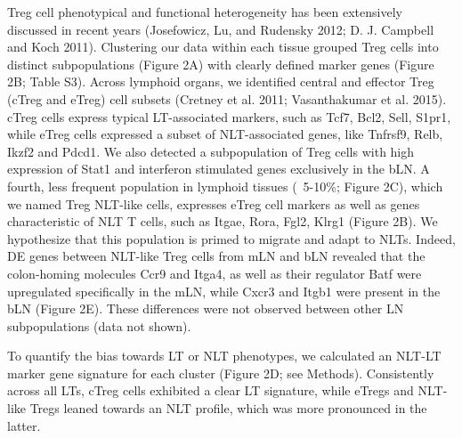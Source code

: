 Treg cell phenotypical and functional heterogeneity has been extensively discussed in recent years (Josefowicz, Lu, and Rudensky 2012; D. J. Campbell and Koch 2011). Clustering our data within each tissue grouped Treg cells into distinct subpopulations (Figure 2A) with clearly defined marker genes (Figure 2B; Table S3). Across lymphoid organs, we identified central and effector Treg (cTreg and eTreg) cell subsets (Cretney et al. 2011; Vasanthakumar et al. 2015). cTreg cells express typical LT-associated markers, such as Tcf7, Bcl2, Sell, S1pr1, while eTreg cells expressed a subset of NLT-associated genes, like Tnfrsf9, Relb, Ikzf2 and Pdcd1. We also detected a subpopulation of Treg cells with high expression of Stat1 and interferon stimulated genes exclusively in the bLN. A fourth, less frequent population in lymphoid tissues (~5-10\%; Figure 2C), which we named Treg NLT-like cells, expresses eTreg cell markers as well as genes characteristic of NLT T cells, such as Itgae, Rora, Fgl2, Klrg1 (Figure 2B). We hypothesize that this population is primed to migrate and adapt to NLTs. Indeed, DE genes between NLT-like Treg cells from mLN and bLN revealed that the colon-homing molecules Ccr9 and Itga4, as well as their regulator Batf were upregulated specifically in the mLN, while Cxcr3 and Itgb1 were present in the bLN (Figure 2E). These differences were not observed between other LN subpopulations (data not shown).

To quantify the bias towards LT or NLT phenotypes, we calculated an NLT-LT marker gene signature for each cluster (Figure 2D; see Methods). Consistently across all LTs, cTreg cells exhibited a clear LT signature, while eTregs and NLT-like Tregs leaned towards an NLT profile, which was more pronounced in the latter. 

